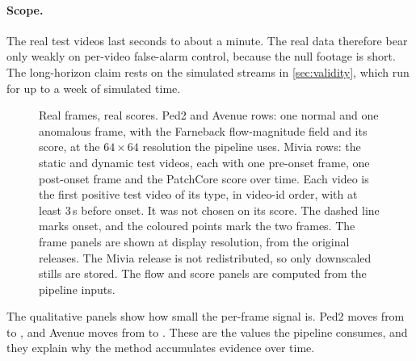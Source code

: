 \paragraph{Scope.} The real test videos last seconds to about a minute. The real data therefore bear only weakly on per-video false-alarm control, because
the null footage is short. The long-horizon
claim rests on the simulated streams in \cref{sec:validity}, which run for up
to a week of simulated time.

\begin{figure}[t]
  \centering
  \caption{Real frames, real scores. Ped2 and Avenue rows: one normal and one
  anomalous frame, with the Farneback flow-magnitude field and its score, at
  the $64\times64$ resolution the pipeline uses. Mivia rows: the static and
  dynamic test videos, each with one pre-onset frame, one post-onset frame and
  the PatchCore score over time. Each video is the first positive test video of
  its type, in video-id order, with at least 3\,s before onset. It was not
  chosen on its score. The dashed line marks onset, and the coloured points mark
  the two frames. The frame panels are shown at display resolution, from the
  original releases. The Mivia release is not redistributed, so only downscaled
  stills are stored. The flow and score panels are computed from the pipeline
  inputs.}
  \label{fig:qualitative}
\end{figure}

The qualitative panels show how small the per-frame signal is. Ped2 moves from
\QualExamplePedTwoNormal{} to \QualExamplePedTwoAnomalous{}, and Avenue moves
from \QualExampleAvenueNormal{} to \QualExampleAvenueAnomalous{}. These are
the values the pipeline consumes, and they explain why the method accumulates
evidence over time.
